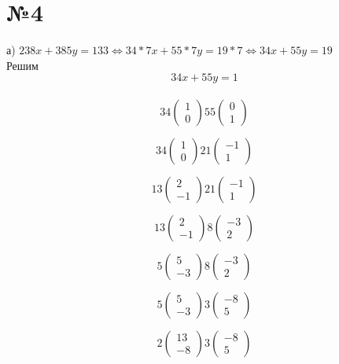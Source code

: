 \documentclass[a4paper,12pt]{article} %
\begin{document}
\section*{№4}
а) $238x+385y=133 \Leftrightarrow 34*7x+55*7y=19*7 \Leftrightarrow
34x+55y=19 $\\
Решим  \[34x+55y=1\]\\

\[34\begin{pmatrix}1\\0\end{pmatrix}55\begin{pmatrix}0\\1\end{pmatrix}\]

\[34\begin{pmatrix}1\\0\end{pmatrix}21\begin{pmatrix}-1\\1\end{pmatrix}\]

\[13\begin{pmatrix}2\\-1\end{pmatrix}21\begin{pmatrix}-1\\1\end{pmatrix}\]

\[13\begin{pmatrix}2\\-1\end{pmatrix}8\begin{pmatrix}-3\\2\end{pmatrix}\]

\[5\begin{pmatrix}5\\-3\end{pmatrix}8\begin{pmatrix}-3\\2\end{pmatrix}\]

\[5\begin{pmatrix}5\\-3\end{pmatrix}3\begin{pmatrix}-8\\5\end{pmatrix}\]

\[2\begin{pmatrix}13\\-8\end{pmatrix}3\begin{pmatrix}-8\\5\end{pmatrix}\]
\end{document}
